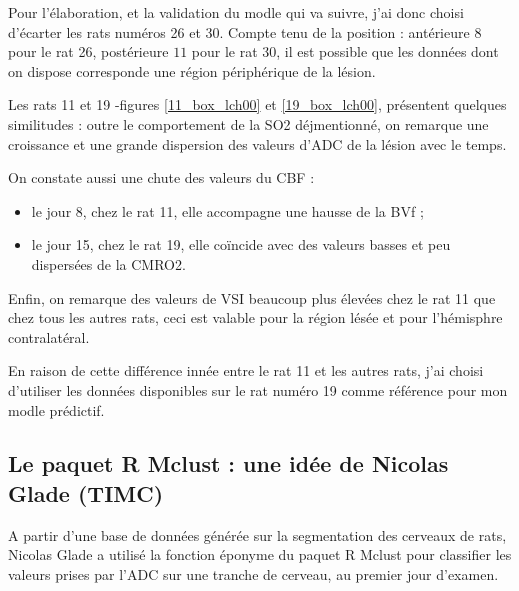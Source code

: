 \par
Pour l'\'elaboration, et la validation du modle qui va suivre, j'ai donc choisi d'\'ecarter les rats num\'eros 26 et 30. %
Compte tenu de la position : ant\'erieure  $8$ pour le rat 26, post\'erieure  $11$ pour le rat 30, %
il est possible que les donn\'ees dont on dispose corresponde  une r\'egion p\'eriph\'erique de la l\'esion.

\etoile
Les rats 11 et 19 -figures \ref{11_box_lch00} et \ref{19_box_lch00}, pr\'esentent quelques similitudes : %
outre le comportement de la SO2 d\'ejmentionn\'e, on remarque une croissance et une grande dispersion des valeurs d'ADC de la l\'esion avec le temps.

\par
On constate aussi une chute des valeurs du CBF :
\begin{itemize}
\item le jour 8, chez le rat 11, elle accompagne une hausse de la BVf ;
\item le jour 15, chez le rat 19, elle co\"incide avec des valeurs basses et peu dispers\'ees de la CMRO2.
\end{itemize}

\etoile
Enfin, on remarque des valeurs de VSI beaucoup plus \'elev\'ees chez le rat 11 que chez tous les autres rats, %
ceci est valable pour la r\'egion l\'es\'ee et pour l'h\'emisphre contralat\'eral.

\par
En raison de cette diff\'erence inn\'ee entre le rat 11 et les autres rats, %
j'ai choisi d'utiliser les donn\'ees disponibles sur le rat num\'ero 19 comme r\'ef\'erence pour mon modle pr\'edictif.

\FloatBarrier
\subsection{Le paquet R Mclust : une id\'ee de Nicolas Glade (TIMC)}%




A partir d'une base de donn\'ees g\'en\'er\'ee sur la segmentation des cerveaux de rats, Nicolas Glade a utilis\'e la fonction \'eponyme du paquet R Mclust %
pour classifier les valeurs prises par l'ADC sur une tranche de cerveau, au premier jour d'examen.

